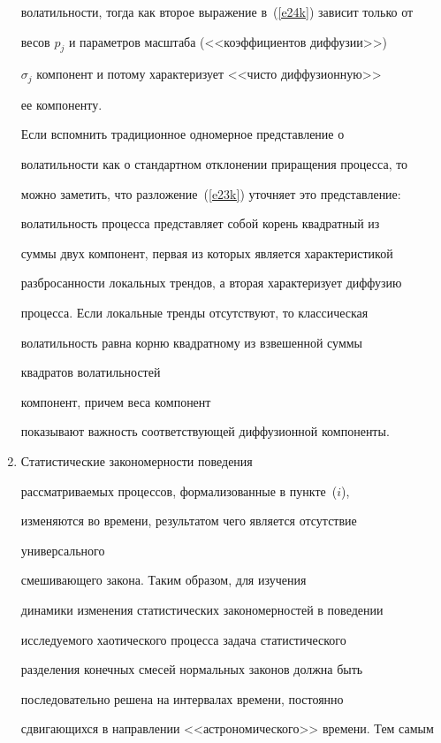 \begin{multicols}{2}
\begin{enumerate}[($i$)]
волатильности, тогда как второе выражение в~(\ref{e24k}) зависит только от


весов $p_j$ и параметров масштаба (<<коэффициентов диффузии>>)


$\sigma_j$ компонент и потому характеризует <<чисто диффузионную>>


ее компоненту.





Если вспомнить традиционное одномерное представление о


волатильности как о стандартном отклонении приращения процесса, то


можно заметить, что разложение~(\ref{e23k}) уточняет это представление:


волатильность процесса представляет собой корень квадратный из


суммы двух компонент, первая из которых является характеристикой


разбросанности локальных трендов, а вторая характеризует диффузию


процесса. Если локальные тренды отсутствуют, то классическая


волатильность равна корню квадратному из взвешенной суммы


квадратов волатильностей\linebreak


 компонент, причем веса компонент


показывают важность соответствующей диффузионной компоненты.


\item


Статистические закономерности поведения


рассматриваемых процессов, формализованные в пункте~($i$),


изменяются во времени, результатом чего является отсутствие {\it


универсального} смешивающего закона. Таким образом, для изучения


динамики изменения статистических закономерностей в поведении


исследуемого хаотического процесса задача статистического


разделения конечных смесей нормальных законов должна быть


последовательно решена на интервалах времени, постоянно


сдвигающихся в направлении <<астрономического>> времени. Тем самым



\end{enumerate}
\end{multicols}
